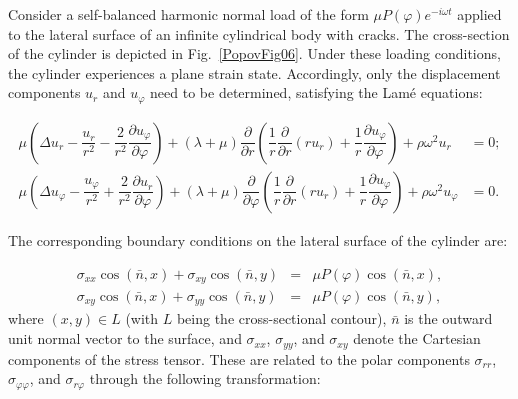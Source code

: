 Consider a self-balanced harmonic normal load of the form $\mu P\left(\varphi \right)e^{-i\omega t}$ applied to the lateral surface of an infinite cylindrical body with cracks. The cross-section of the cylinder is depicted in Fig.~\ref{PopovFig06}. Under these loading conditions, the cylinder experiences a plane strain state. Accordingly, only the displacement components $u_{r}$ and $u_{\varphi}$ need to be determined, satisfying the Lamé equations:

\begin{equation} \label{PopovEq857539}
	\begin{aligned}
		\mu \left(\Delta u_{r} -\dfrac{u_{r}}{r^{2}} - \dfrac{2}{r^{2}} \dfrac{\partial u_{\varphi}}{\partial \varphi} \right)
		+ (\lambda + \mu) \dfrac{\partial}{\partial r} \left(\dfrac{1}{r} \dfrac{\partial}{\partial r}(r u_{r}) + \dfrac{1}{r} \dfrac{\partial u_{\varphi}}{\partial \varphi} \right)
		+ \rho \omega^{2} u_{r} &= 0;
		\\
		\mu \left(\Delta u_{\varphi} -\dfrac{u_{\varphi}}{r^{2}} + \dfrac{2}{r^{2}} \dfrac{\partial u_{r}}{\partial \varphi} \right)
		+ (\lambda + \mu) \dfrac{\partial}{\partial \varphi} \left(\dfrac{1}{r} \dfrac{\partial}{\partial r}(r u_{r}) + \dfrac{1}{r} \dfrac{\partial u_{\varphi}}{\partial \varphi} \right)
		+ \rho \omega^{2} u_{\varphi} &= 0.
	\end{aligned}
\end{equation}

The corresponding boundary conditions on the lateral surface of the cylinder are:

\begin{equation} \label{PopovEq430273}
	\begin{array}{rcl}
		\sigma_{xx} \cos(\bar{n}, x) + \sigma_{xy} \cos(\bar{n}, y) &=& \mu P(\varphi) \cos(\bar{n}, x), \\
		\sigma_{xy} \cos(\bar{n}, x) + \sigma_{yy} \cos(\bar{n}, y) &=& \mu P(\varphi) \cos(\bar{n}, y),
	\end{array}
\end{equation}
where $(x, y) \in L$ (with $L$ being the cross-sectional contour), $\bar{n}$ is the outward unit normal vector to the surface, and $\sigma_{xx}$, $\sigma_{yy}$, and $\sigma_{xy}$ denote the Cartesian components of the stress tensor. These are related to the polar components $\sigma_{rr}$, $\sigma_{\varphi\varphi}$, and $\sigma_{r\varphi}$ through the following transformation:

